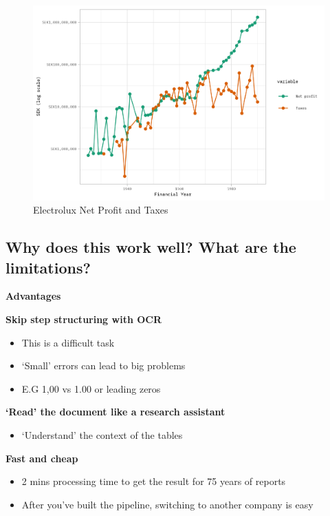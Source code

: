 \documentclass[
  letterpaper,
  DIV=11,
  numbers=noendperiod]{scrartcl}
\providecommand{\tightlist}{%
  \setlength{\itemsep}{0pt}\setlength{\parskip}{0pt}}\usepackage{longtable,booktabs,array}
\begin{document}
\begin{figure}

{\centering \includegraphics{assets/figures.png}

}

\caption{Electrolux Net Profit and Taxes}

\end{figure}

\hypertarget{why-does-this-work-well-what-are-the-limitations}{%
\subsection{Why does this work well? What are the
limitations?}\label{why-does-this-work-well-what-are-the-limitations}}

\textbf{Advantages}

\textbf{Skip step structuring with OCR}

\begin{itemize}
\tightlist
\item
  This is a difficult task
\item
  `Small' errors can lead to big problems
\item
  E.G 1,00 vs 1.00 or leading zeros
\end{itemize}

\textbf{`Read' the document like a research assistant}

\begin{itemize}
\tightlist
\item
  `Understand' the context of the tables
\end{itemize}

\textbf{Fast and cheap}

\begin{itemize}
\tightlist
\item
  2 mins processing time to get the result for 75 years of reports
\item
  After you've built the pipeline, switching to another company is easy
\end{itemize}
\end{document}

